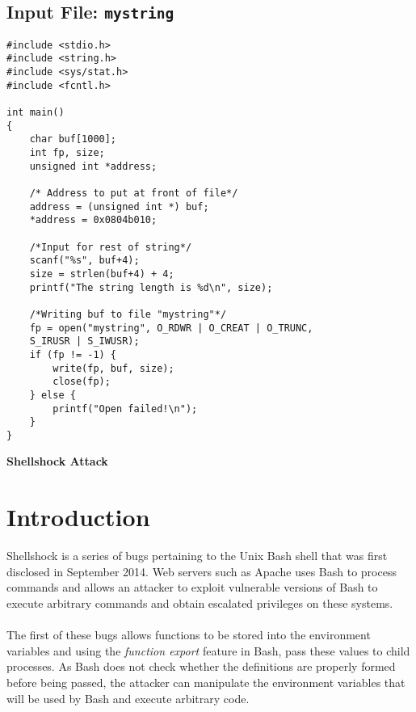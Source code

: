 \documentclass[a4paper,12pt]{article}
\begin{document}
\subsection{Input File: \texttt{mystring}}
\label{Appsec:3.2}
\begin{verbatim}
#include <stdio.h>
#include <string.h>
#include <sys/stat.h>
#include <fcntl.h>

int main()
{
    char buf[1000];
    int fp, size;
    unsigned int *address;

    /* Address to put at front of file*/
    address = (unsigned int *) buf;
    *address = 0x0804b010;

    /*Input for rest of string*/
    scanf("%s", buf+4);
    size = strlen(buf+4) + 4;
    printf("The string length is %d\n", size);

    /*Writing buf to file "mystring"*/
    fp = open("mystring", O_RDWR | O_CREAT | O_TRUNC,
    S_IRUSR | S_IWUSR);
    if (fp != -1) {
        write(fp, buf, size);
        close(fp);
    } else {
        printf("Open failed!\n");
    }
}
\end{verbatim}










\begin{titlepage}
	\begin{center}
				\vspace*{27em}
		\Huge
		\textbf{Shellshock Attack}\\		
	
		\vfill
	\end{center}
\end{titlepage}

\newpage
{}
\setcounter{section}{0}
\section{Introduction}
Shellshock is a series of bugs pertaining to the Unix Bash shell that was first disclosed in September 2014. Web servers such as Apache uses Bash to process commands and allows an attacker to exploit vulnerable versions of Bash to execute arbitrary commands and obtain escalated privileges on these systems.\\\\The first of these bugs allows functions to be stored into the environment variables and using the \textit{function export} feature in Bash, pass these values to child processes. As Bash does not check whether the definitions are properly formed before being passed, the attacker can manipulate the environment variables that will be used by Bash and execute arbitrary code.
\end{document}
